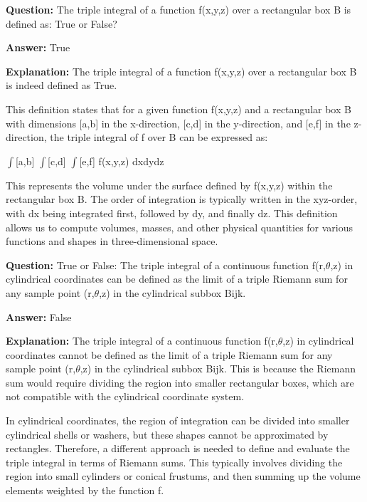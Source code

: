 \documentclass{article}
\begin{document}
                \vspace{0.5cm} 
        
            
                \textbf {Question:} The triple integral of a function f(x,y,z) over a rectangular box B is defined as: True or False?
                
                \textbf{Answer:} True

                \textbf{Explanation:} The triple integral of a function f(x,y,z) over a rectangular box B is indeed defined as True.

This definition states that for a given function f(x,y,z) and a rectangular box B with dimensions [a,b] in the x-direction, [c,d] in the y-direction, and [e,f] in the z-direction, the triple integral of f over B can be expressed as:

\ensuremath{\int}[a,b] \ensuremath{\int}[c,d] \ensuremath{\int}[e,f] f(x,y,z) dxdydz

This represents the volume under the surface defined by f(x,y,z) within the rectangular box B. The order of integration is typically written in the xyz-order, with dx being integrated first, followed by dy, and finally dz. This definition allows us to compute volumes, masses, and other physical quantities for various functions and shapes in three-dimensional space.
                
                \vspace{0.5cm} 
        
            
                \textbf {Question:} True or False: The triple integral of a continuous function f(r,\ensuremath{\theta},z) in cylindrical coordinates can be defined as the limit of a triple Riemann sum for any sample point (r,\ensuremath{\theta},z) in the cylindrical subbox Bijk.
                
                \textbf{Answer:} False

                \textbf{Explanation:} The triple integral of a continuous function f(r,\ensuremath{\theta},z) in cylindrical coordinates cannot be defined as the limit of a triple Riemann sum for any sample point (r,\ensuremath{\theta},z) in the cylindrical subbox Bijk. This is because the Riemann sum would require dividing the region into smaller rectangular boxes, which are not compatible with the cylindrical coordinate system.

In cylindrical coordinates, the region of integration can be divided into smaller cylindrical shells or washers, but these shapes cannot be approximated by rectangles. Therefore, a different approach is needed to define and evaluate the triple integral in terms of Riemann sums. This typically involves dividing the region into small cylinders or conical frustums, and then summing up the volume elements weighted by the function f.
                
\end{document}
